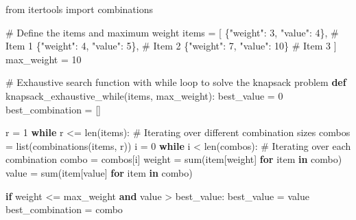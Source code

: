 \documentclass[
  letterpaper,
  DIV=11,
  numbers=noendperiod]{scrreprt}
\newenvironment{Shaded}{\begin{snugshade}}{\end{snugshade}}
\newcommand{\BuiltInTok}[1]{\textcolor[rgb]{0.00,0.23,0.31}{#1}}
\newcommand{\CommentTok}[1]{\textcolor[rgb]{0.37,0.37,0.37}{#1}}
\newcommand{\ControlFlowTok}[1]{\textcolor[rgb]{0.00,0.23,0.31}{\textbf{#1}}}
\newcommand{\DecValTok}[1]{\textcolor[rgb]{0.68,0.00,0.00}{#1}}
\newcommand{\ImportTok}[1]{\textcolor[rgb]{0.00,0.46,0.62}{#1}}
\newcommand{\KeywordTok}[1]{\textcolor[rgb]{0.00,0.23,0.31}{\textbf{#1}}}
\newcommand{\NormalTok}[1]{\textcolor[rgb]{0.00,0.23,0.31}{#1}}
\newcommand{\OperatorTok}[1]{\textcolor[rgb]{0.37,0.37,0.37}{#1}}
\newcommand{\StringTok}[1]{\textcolor[rgb]{0.13,0.47,0.30}{#1}}
\begin{document}
\begin{Shaded}
\begin{Highlighting}[]
\ImportTok{from}\NormalTok{ itertools }\ImportTok{import}\NormalTok{ combinations}

\CommentTok{\# Define the items and maximum weight}
\NormalTok{items }\OperatorTok{=}\NormalTok{ [}
\NormalTok{    \{}\StringTok{"weight"}\NormalTok{: }\DecValTok{3}\NormalTok{, }\StringTok{"value"}\NormalTok{: }\DecValTok{4}\NormalTok{\},  }\CommentTok{\# Item 1}
\NormalTok{    \{}\StringTok{"weight"}\NormalTok{: }\DecValTok{4}\NormalTok{, }\StringTok{"value"}\NormalTok{: }\DecValTok{5}\NormalTok{\},  }\CommentTok{\# Item 2}
\NormalTok{    \{}\StringTok{"weight"}\NormalTok{: }\DecValTok{7}\NormalTok{, }\StringTok{"value"}\NormalTok{: }\DecValTok{10}\NormalTok{\}  }\CommentTok{\# Item 3}
\NormalTok{]}
\NormalTok{max\_weight }\OperatorTok{=} \DecValTok{10}

\CommentTok{\# Exhaustive search function with while loop to solve the knapsack problem}
\KeywordTok{def}\NormalTok{ knapsack\_exhaustive\_while(items, max\_weight):}
\NormalTok{    best\_value }\OperatorTok{=} \DecValTok{0}
\NormalTok{    best\_combination }\OperatorTok{=}\NormalTok{ []}

\NormalTok{    r }\OperatorTok{=} \DecValTok{1}
    \ControlFlowTok{while}\NormalTok{ r }\OperatorTok{\textless{}=} \BuiltInTok{len}\NormalTok{(items):  }\CommentTok{\# Iterating over different combination sizes}
\NormalTok{        combos }\OperatorTok{=} \BuiltInTok{list}\NormalTok{(combinations(items, r))}
\NormalTok{        i }\OperatorTok{=} \DecValTok{0}
        \ControlFlowTok{while}\NormalTok{ i }\OperatorTok{\textless{}} \BuiltInTok{len}\NormalTok{(combos):  }\CommentTok{\# Iterating over each combination}
\NormalTok{            combo }\OperatorTok{=}\NormalTok{ combos[i]}
\NormalTok{            weight }\OperatorTok{=} \BuiltInTok{sum}\NormalTok{(item[}\StringTok{\textquotesingle{}weight\textquotesingle{}}\NormalTok{] }\ControlFlowTok{for}\NormalTok{ item }\KeywordTok{in}\NormalTok{ combo)}
\NormalTok{            value }\OperatorTok{=} \BuiltInTok{sum}\NormalTok{(item[}\StringTok{\textquotesingle{}value\textquotesingle{}}\NormalTok{] }\ControlFlowTok{for}\NormalTok{ item }\KeywordTok{in}\NormalTok{ combo)}

            \ControlFlowTok{if}\NormalTok{ weight }\OperatorTok{\textless{}=}\NormalTok{ max\_weight }\KeywordTok{and}\NormalTok{ value }\OperatorTok{\textgreater{}}\NormalTok{ best\_value:}
\NormalTok{                best\_value }\OperatorTok{=}\NormalTok{ value}
\NormalTok{                best\_combination }\OperatorTok{=}\NormalTok{ combo}


\end{Highlighting}
\end{Shaded}
\end{document}
